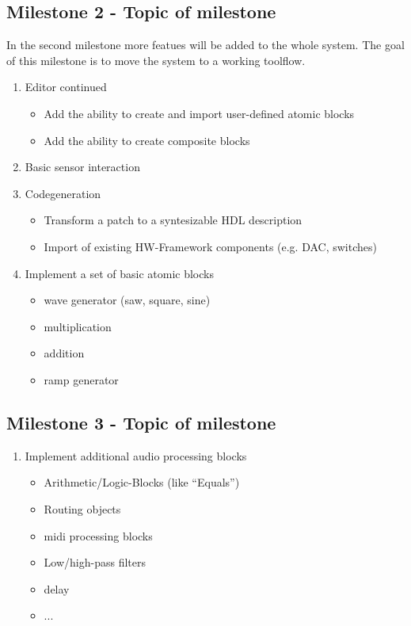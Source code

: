 \subsection{Milestone 2 - Topic of milestone}

In the second milestone more featues will be added to the whole system. The goal of this milestone is to move the system to a working toolflow.

	\begin{enumerate}
		\item Editor continued
			\begin{itemize}
				\item Add the ability to create and import user-defined atomic blocks
				\item Add the ability to create composite blocks
			\end{itemize}
		\item Basic sensor interaction
			\begin{itemize}
			\end{itemize}
		\item Codegeneration	
			\begin{itemize}
				\item Transform a patch to a syntesizable HDL description
				\item Import of existing HW-Framework components (e.g. DAC, switches)
			\end{itemize}
		\item Implement a set of basic atomic blocks
			\begin{itemize}
				\item wave generator (saw, square, sine)
				\item multiplication
				\item addition
				\item ramp generator
			\end{itemize}
	\end{enumerate}

\subsection{Milestone 3 - Topic of milestone}
	
	\begin{enumerate}
		\item Implement additional audio processing blocks
		\begin{itemize}
			\item Arithmetic/Logic-Blocks (like "`Equals"')
			\item Routing objects
			\item midi processing blocks
			\item Low/high-pass filters
			\item delay
			\item ...
		\end{itemize}
	\end{enumerate}
	
